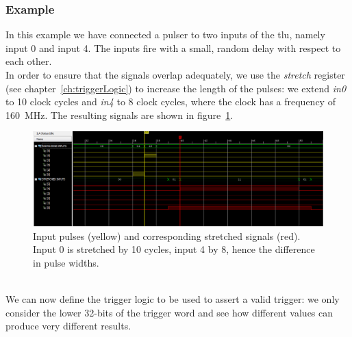 \subsubsection{Example}
In this example we have connected a pulser to two inputs of the \gls{tlu}, namely input 0 and input 4. The inputs fire with a small, random delay with respect to each other.\\
In order to ensure that the signals overlap adequately, we use the \emph{stretch} register (see chapter~\ref{ch:triggerLogic}) to increase the length of the pulses: we extend \emph{in0} to 10 clock cycles and \emph{in4} to 8 clock cycles, where the clock has a frequency of 160~MHz. The resulting signals are shown in figure~\ref{Fig:exampleExtendedTriggers}.
\begin{figure}
  \centering
  \includegraphics[width=.90\textwidth]{./Images/Initial.png}
  \caption{Input pulses (yellow) and corresponding stretched signals (red). Input 0 is stretched by 10 cycles, input 4 by 8, hence the difference in pulse widths.}
  \label{Fig:exampleExtendedTriggers}
\end{figure}\\
We can now define the trigger logic to be used to assert a valid trigger: we only consider the lower 32-bits of the trigger word and see how different values can produce very different results.

